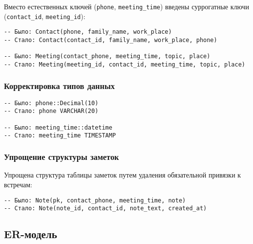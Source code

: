\documentclass[14pt]{extarticle}
\begin{document}
Вместо естественных ключей (\texttt{phone}, \texttt{meeting\_time}) введены суррогатные ключи (\texttt{contact\_id}, \texttt{meeting\_id}):

\begin{verbatim}
-- Было: Contact(phone, family_name, work_place)
-- Стало: Contact(contact_id, family_name, work_place, phone)

-- Было: Meeting(contact_phone, meeting_time, topic, place)
-- Стало: Meeting(meeting_id, contact_id, meeting_time, topic, place)
\end{verbatim}

\subsubsection{Корректировка типов данных}

\begin{verbatim}
-- Было: phone::Decimal(10)
-- Стало: phone VARCHAR(20)

-- Было: meeting_time::datetime
-- Стало: meeting_time TIMESTAMP
\end{verbatim}

\subsubsection{Упрощение структуры заметок}

Упрощена структура таблицы заметок путем удаления обязательной привязки к встречам:

\begin{verbatim}
-- Было: Note(pk, contact_phone, meeting_time, note)
-- Стало: Note(note_id, contact_id, note_text, created_at)
\end{verbatim}

\subsection{ER-модель}
\end{document}
